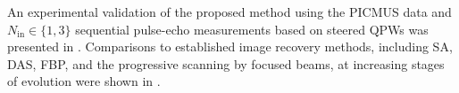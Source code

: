 An experimental validation of
the proposed method using
the \ac{PICMUS} data and
$N_{\text{in}} \in \{ 1, 3 \}$ sequential pulse-echo measurements based on
steered \acp{QPW} was presented in
\cite{proc:SchiffnerIUS2016b}.
Comparisons to
established image recovery methods, including
\ac{SA},
\ac{DAS},
\acl{FBP}, and
the progressive scanning by
focused beams, at
increasing stages of
evolution were shown in
\cite{proc:SchiffnerIUS2013a,proc:SchiffnerIUS2012,article:SchiffnerBMT2012,proc:SchiffnerIUS2011}.
